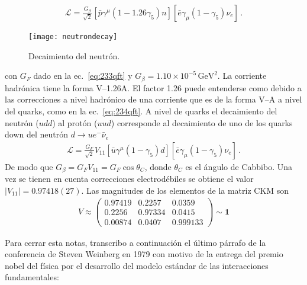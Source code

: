 \begin{frame}
\begin{align}
    \mathcal{L}=\frac{G_\beta}{\sqrt{2}}\left[\bar{p}\gamma^\mu(1-1.26\gamma_5)n\right]\left[\bar{e}\gamma_\mu(1-\gamma_5)\nu_e\right]\,.
\end{align}
\begin{figure}
  \centering
  \texttt{[image: neutrondecay]}
  \caption{Decaimiento del neutrón.}
  \label{fig:neutrondecay}
\end{figure}
con $G_F$ dado en la ec.~\eqref{eq:233qft} y $G_\beta=1.10\times 10^{-5}\,\text{GeV}^2$. La corriente hadrónica tiene la forma V--1.26A. El factor 1.26  puede entenderse como debido a las correcciones a nivel hadrónico de una corriente que es de la forma V--A a nivel del quarks, como en la ec.~\eqref{eq:234qft}. A nivel de quarks el decaimiento del neutrón ($udd$) al protón ($uud$) corresponde al decaimiento de uno de los quarks down del neutrón $d\to u e^- \bar{\nu}_e$
\begin{align}
    \mathcal{L}=\frac{G_F}{\sqrt{2}}V_{11}\left[\bar{u}\gamma^\mu(1-\gamma_5)d\right]\left[\bar{e}\gamma_\mu(1-\gamma_5)\nu_e\right]\,.
\end{align}
De modo que $G_\beta=G_F V_{11}=G_F\cos\theta_C$, donde $\theta_C$ es el ángulo de Cabbibo. Una vez se tienen en cuenta correcciones electrodébiles se obtiene el valor $|V_{11}|=0.97418(27)$\cite{PDG}. Las magnitudes de los elementos de la matriz CKM son\cite{PDG}
\begin{align}
  V\approx\begin{pmatrix}
    0.97419&0.2257&0.0359\\
    0.2256&0.97334&0.0415\\
    0.00874&0.0407&0.999133
  \end{pmatrix}\sim \mathbf{1}
\end{align}
\end{frame}

Para cerrar esta notas, transcribo a continuación el último párrafo de la conferencia de Steven Weinberg en 1979 con motivo de la entrega del premio nobel del física por el desarrollo del modelo estándar de las interacciones fundamentales:

